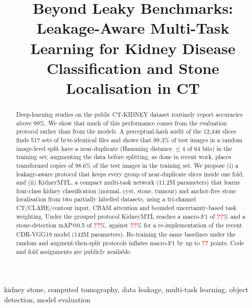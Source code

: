 \documentclass[conference]{IEEEtran}
\newcommand{\tbd}{\textcolor{red}{\textbf{??}}}            %
\begin{document}
\title{Beyond Leaky Benchmarks: Leakage-Aware Multi-Task Learning for Kidney Disease Classification and Stone Localisation in CT}

\author{
}

\maketitle

\begin{abstract}
Deep-learning studies on the public CT-KIDNEY dataset routinely report accuracies above 99\%. We show that
much of this performance comes from the evaluation protocol rather than from the models. A perceptual-hash audit
of the 12,446 slices finds 517 sets of byte-identical files and shows that 99.3\% of test images in a random
image-level split have a near-duplicate (Hamming distance $\le$4 of 64 bits) in the training set; augmenting
the data before splitting, as done in recent work, places transformed copies of 98.6\% of the test images in the
training set. We propose (i) a leakage-aware protocol that keeps every group of near-duplicate slices inside one
fold, and (ii) KidneyMTL, a compact multi-task network (11.2M parameters) that learns four-class kidney
classification (normal, cyst, stone, tumour) and anchor-free stone localisation from two partially labelled
datasets, using a tri-channel CT/CLAHE/contour input, CBAM attention and bounded uncertainty-based task
weighting. Under the grouped protocol KidneyMTL reaches a macro-F1 of \tbd\% and a stone-detection mAP@0.5 of
\tbd\%, against \tbd\% for a re-implementation of the recent CDR-VGG19 model (142M parameters). Re-training the
same baselines under the random and augment-then-split protocols inflates macro-F1 by up to \tbd{} points. Code
and fold assignments are publicly available.
\end{abstract}

\begin{IEEEkeywords}
kidney stone, computed tomography, data leakage, multi-task learning, object detection, model evaluation
\end{IEEEkeywords}
\end{document}
